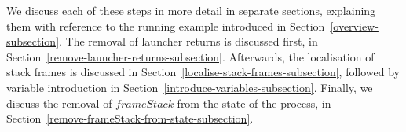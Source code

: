 We discuss each of these steps in more detail in separate sections,
explaining them with reference to the running example introduced in
Section~\ref{overview-subsection}.
The removal of launcher returns is discussed first, in
Section~\ref{remove-launcher-returns-subsection}.
Afterwards, the localisation of stack frames is discussed in
Section~\ref{localise-stack-frames-subsection}, followed by variable
introduction in Section~\ref{introduce-variables-subsection}.
Finally, we discuss the removal of $frameStack$ from the state of the
process, in Section~\ref{remove-frameStack-from-state-subsection}.
